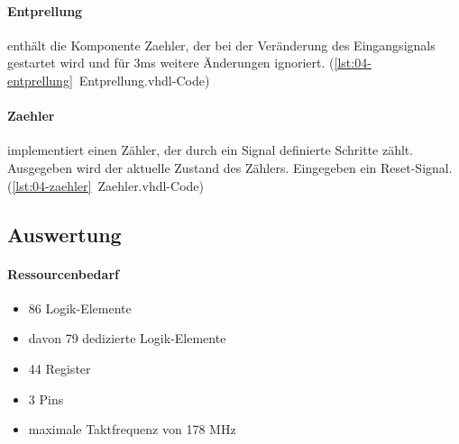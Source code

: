 	\paragraph{Entprellung} enthält die Komponente Zaehler, der bei der Veränderung des Eingangsignals gestartet wird und für 3ms weitere Änderungen ignoriert. (\ref{lst:04-entprellung}~Entprellung.vhdl-Code) 

	\paragraph{Zaehler} implementiert einen Zähler, der durch ein Signal definierte Schritte zählt. Ausgegeben wird der aktuelle Zustand des Zählers. Eingegeben ein Reset-Signal. (\ref{lst:04-zaehler}~Zaehler.vhdl-Code) 


\subsection{Auswertung}
	\paragraph{Ressourcenbedarf}
	\begin{itemize} 
	\item 86 Logik-Elemente
	\item davon 79 dedizierte Logik-Elemente
	\item 44 Register
	\item 3 Pins 
	\item maximale Taktfrequenz von 178 MHz
	\end{itemize}

